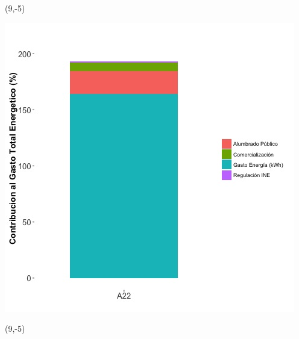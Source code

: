 \documentclass{article}\usepackage[]{graphicx}\usepackage[]{color}
\newenvironment{knitrout}{}{} %
\begin{document}
 \begin{textblock}{1}(9,-5)
\begin{minipage}{20em}
\begingroup

\endgroup
\end{minipage}
\end{textblock}

\begin{knitrout}
\color{fgcolor}
\includegraphics[scale=0.65]{figure/A22_costvars_plot.jpg} 
\end{knitrout}

 \begin{textblock}{1}(9,-5)
\begin{minipage}{20em}
\begingroup

\endgroup
\end{minipage}
\end{textblock}
\end{document}
